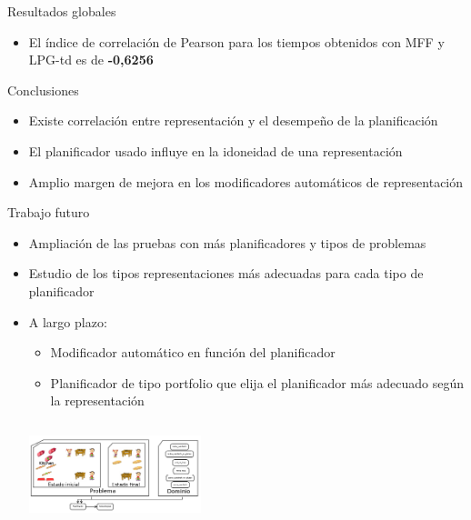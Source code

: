 \documentclass[xcolor=table]{beamer}
\begin{document}
\begin{frame}{Resultados globales}
\begin{itemize}
    \item El índice de correlación de Pearson para los tiempos obtenidos con MFF y LPG-td es de \textbf{-0,6256}
\end{itemize}

\end{frame}


\begin{frame}{Conclusiones}
    \begin{itemize}
        \item Existe correlación entre representación y el desempeño de la planificación
        \item El planificador usado influye en la idoneidad de una representación
        \item Amplio margen de mejora en los modificadores automáticos de representación
    \end{itemize}
\end{frame}


\begin{frame}{Trabajo futuro}
    \begin{itemize}
        \item Ampliación de las pruebas con más planificadores y tipos de problemas
        \item Estudio de los tipos representaciones más adecuadas para cada tipo de planificador
        \item A largo plazo:
        \begin{itemize}
            \item Modificador automático en función del planificador
            \item Planificador de tipo portfolio que elija el planificador más adecuado según la representación
        \end{itemize}
        
    \begin{center}
        \includegraphics[width=5cm,height=3cm]{childSnack2}
    \end{center}
        
    \end{itemize}
\end{frame}


\end{document}
